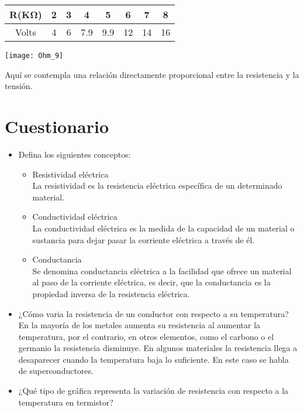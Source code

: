 \documentclass[11pt]{article}
\newenvironment{Figuras}
  {\par\medskip\noindent\minipage{\linewidth}}
  {\endminipage\par\medskip}
\begin{document}
\begin{multicols}{2}
		  \begin{tabular}{@{}cccccccc@{}}
		    \toprule

		    R(KΩ)&	2&	3&	4&	5&	6&	7&	8\\
		    \midrule
		    Volts&	4&	6&	7.9&	9.9&	12&	14&	16\\

		    \bottomrule
		  \end{tabular}


		\begin{Figuras}
			\centering
		    \texttt{[image: Ohm\_9]}
		    \label{fig:mesh9}
		\end{Figuras}

		Aquí se contempla una relación directamente proporcional entre la resistencia y la tensión.


\section{Cuestionario}
	\begin{itemize}

		\item	Defina los siguientes conceptos:
			\begin{itemize}
				\item Resistividad eléctrica\\
				La resistividad es la resistencia eléctrica específica de un determinado material.
				\item Conductividad eléctrica\\
				La conductividad eléctrica es la medida de la capacidad de un material o sustancia para dejar pasar la corriente eléctrica a través de él.
				\item Conductancia\\
				Se denomina conductancia eléctrica a la facilidad que ofrece un material al paso de la corriente eléctrica, es decir, que la conductancia es la propiedad inversa de la resistencia eléctrica. 
			\end{itemize}

		\item ¿Cómo varia la resistencia de un conductor con respecto a su temperatura?\\
		En la mayoría de los metales aumenta su resistencia al aumentar la temperatura, por 
		el contrario, en otros elementos, como el carbono o el germanio la resistencia 
		disminuye. 
		En algunos materiales la resistencia llega a desaparecer 
		cuando la temperatura baja lo suficiente. En este caso se habla de superconductores. 
		\item ¿Qué tipo de gráfica representa la variación de resistencia con respecto a la temperatura en termistor?\\


\end{itemize}
\end{multicols}
\end{document}
